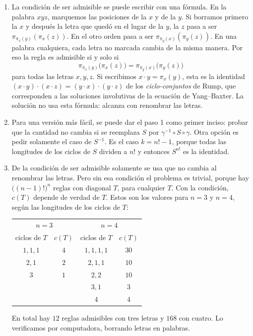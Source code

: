 \documentclass[11pt]{amsproc}
\begin{document}
\begin{enumerate}
  \item La condición de ser admisible se puede escribir con una fórmula.
        En la palabra $xyz$, marquemos las posiciones de la $x$ y de la $y$.
        Si borramos primero la $x$ y después la letra que quedó en el lugar
        de la $y$, la $z$ pasa a ser $\pi_{\pi_x(y)}(\pi_x(z))$. En el otro
        orden pasa a ser $\pi_{\pi_y(x)}(\pi_y(z))$. En una palabra
        cualquiera, cada letra no marcada cambia de la misma manera. Por eso
        la regla es admisible si y solo si
        \[
          \pi_{\pi_x(y)}\bigl(\pi_x(z)\bigr)=\pi_{\pi_y(x)}\bigl(\pi_y(z)\bigr)
        \]
        para todas las letras $x,y,z$. Si escribimos $x\cdot y=\pi_x(y)$,
        esta es la identidad $(x\cdot y)\cdot(x\cdot z)=(y\cdot x)\cdot(y\cdot
        z)$ de los \emph{ciclo-conjuntos} de Rump, que corresponden a las
        soluciones involutivas de la ecuación de Yang--Baxter. La solución no
        usa esta fórmula: alcanza con renombrar las letras.

  \item Para una versión más fácil, se puede dar el paso 1 como primer
        inciso: probar que la cantidad no cambia si se reemplaza $S$ por
        $\gamma^{-1}\circ S\circ\gamma$. Otra opción es pedir solamente el
        caso de $S^{-1}$. Es el caso $k=n!-1$, porque todas las longitudes de
        los ciclos de $S$ dividen a $n!$ y entonces $S^{n!}$ es la
        identidad.

  \item De la condición de ser admisible solamente se usa que no cambia al
        renombrar las letras. Pero sin esa condición el problema es trivial,
        porque hay $\bigl((n-1)!\bigr)^n$ reglas con diagonal $T$, para
        cualquier $T$. Con la condición, $c(T)$ depende de verdad de $T$.
        Estos son los valores para $n=3$ y $n=4$, según las longitudes de los
        ciclos de $T$:
        \begin{center}
        \begin{tabular}{cc@{\qquad\qquad}cc}
          \multicolumn{2}{c}{$n=3$} & \multicolumn{2}{c}{$n=4$}\\[2pt]
          ciclos de $T$ & $c(T)$ & ciclos de $T$ & $c(T)$\\\hline
          $1,1,1$ & $4$ & $1,1,1,1$ & $30$\\
          $2,1$   & $2$ & $2,1,1$   & $10$\\
          $3$     & $1$ & $2,2$     & $10$\\
                  &     & $3,1$     & $3$\\
                  &     & $4$       & $4$
        \end{tabular}
        \end{center}
        En total hay $12$ reglas admisibles con tres letras y $168$ con
        cuatro. Lo verificamos por computadora, borrando letras en palabras.


\end{enumerate}
\end{document}
